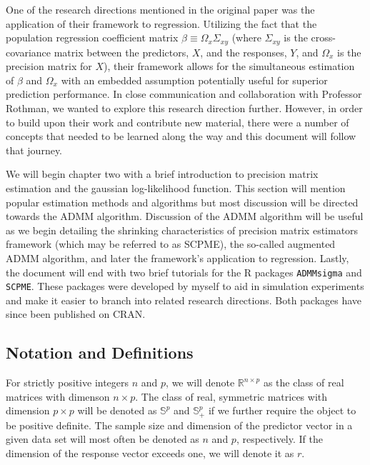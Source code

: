 \documentclass[11pt,]{report}
\theoremstyle{definition}
\theoremstyle{definition}
\theoremstyle{definition}
\theoremstyle{remark}
\begin{document}
One of the research directions mentioned in the original paper was the application of their framework to regression. Utilizing the fact that the population regression coefficient matrix \(\beta \equiv \Omega_{x}\Sigma_{xy}\) (where \(\Sigma_{xy}\) is the cross-covariance matrix between the predictors, \(X\), and the responses, \(Y\), and \(\Omega_{x}\) is the precision matrix for \(X\)), their framework allows for the simultaneous estimation of \(\beta\) and \(\Omega_{x}\) with an embedded assumption potentially useful for superior prediction performance. In close communication and collaboration with Professor Rothman, we wanted to explore this research direction further. However, in order to build upon their work and contribute new material, there were a number of concepts that needed to be learned along the way and this document will follow that journey.

We will begin chapter two with a brief introduction to precision matrix estimation and the gaussian log-likelihood function. This section will mention popular estimation methods and algorithms but most discussion will be directed towards the ADMM algorithm. Discussion of the ADMM algorithm will be useful as we begin detailing the shrinking characteristics of precision matrix estimators framework (which may be referred to as SCPME), the so-called augmented ADMM algorithm, and later the framework's application to regression. Lastly, the document will end with two brief tutorials for the R packages \texttt{ADMMsigma} and \texttt{SCPME}. These packages were developed by myself to aid in simulation experiments and make it easier to branch into related research directions. Both packages have since been published on CRAN.

\hypertarget{notation-and-definitions}{%
\subsection{Notation and Definitions}\label{notation-and-definitions}}

For strictly positive integers \(n\) and \(p\), we will denote \(\mathbb{R}^{n \times p}\) as the class of real matrices with dimenson \(n \times p\). The class of real, symmetric matrices with dimension \(p \times p\) will be denoted as \(\mathbb{S}^{p}\) and \(\mathbb{S}^{p}_{+}\) if we further require the object to be positive definite. The sample size and dimension of the predictor vector in a given data set will most often be denoted as \(n\) and \(p\), respectively. If the dimension of the response vector exceeds one, we will denote it as \(r\).
\end{document}

